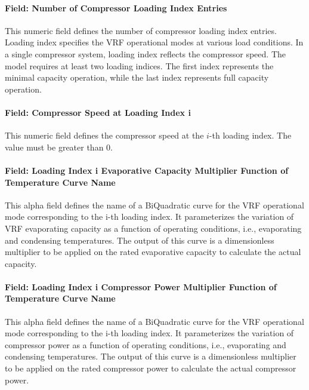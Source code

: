 \paragraph{Field: Number of Compressor Loading Index Entries}

This numeric field defines the number of compressor loading index entries. Loading index specifies the VRF operational modes at various load conditions. In a single compressor system, loading index reflects the compressor speed. The model requires at least two loading indices. The first index represents the minimal capacity operation, while the last index represents full capacity operation.

\paragraph{Field: Compressor Speed at Loading Index i}

This numeric field defines the compressor speed at the $i$-th loading index. The value must be greater than 0.

\paragraph{Field: Loading Index i Evaporative Capacity Multiplier Function of Temperature Curve Name}

This alpha field defines the name of a BiQuadratic curve for the VRF operational mode corresponding to the i-th loading index. It parameterizes the variation of VRF evaporating capacity as a function of operating conditions, i.e., evaporating and condensing temperatures. The output of this curve is a dimensionless multiplier to be applied on the rated evaporative capacity to calculate the actual capacity.

\paragraph{Field: Loading Index i Compressor Power Multiplier Function of Temperature Curve Name}

This alpha field defines the name of a BiQuadratic curve for the VRF operational mode corresponding to the i-th loading index. It parameterizes the variation of compressor power as a function of operating conditions, i.e., evaporating and condensing temperatures. The output of this curve is a dimensionless multiplier to be applied on the rated compressor power to calculate the actual compressor power.

